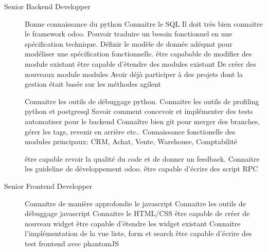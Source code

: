 \begin{description}
  \item[Senior Backend Developper] 
  Bonne connaissance du python
  Connaitre le SQL
  Il doit très bien connaitre le framework odoo. 
  Pouvoir traduire un besoin fonctionnel en une spécification technique.
  Définir le modèle de donnée adéquat pour modéliser une spécification fonctionnelle.
  être capabable de modifier des module existant
  être capable d'étendre des modules existant
  De créer des nouveaux module modules
  Avoir déjà participer à des projets dont la gestion était basée sur les méthodes agilent

  Connaitre les outils de débuggage python.
  Connaitre les outils de profiling python et postgresql
  Savoir comment concevoir et implémenter des tests automatiser pour le backend 
  Connaître bien git pour merger des branches, gérer les tags, revenir en arrière etc..
  Connaissance fonctionelle des modules principaux: CRM, Achat, Vente, Warehouse, Comptabilité
  
  être capable revoir la qualité du code et de donner un feedback.
  Connaitre les guideline de développement odoo. 
  être capable d'écrire des script RPC
  
  \item[Senior Frontend Developper] 
  Connaitre de manière approfondie le javascript
  Connaitre les outils de débuggage javascript
  Connaitre le HTML/CSS 
  être capable de créer de nouveau widget
  être capable d'étendre les widget existant
  Connaitre l'implémentation de la vue liste, form et search
  être capable d'écrire des test frontend avec phantomJS
  
\end{description}




